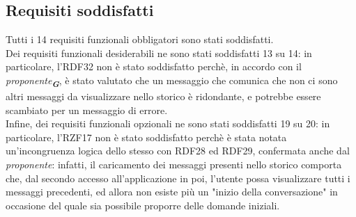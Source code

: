 \subsection{Requisiti soddisfatti}
\label{sec:requisiti_soddisfatti}

Tutti i 14 requisiti funzionali obbligatori sono stati soddisfatti.\\
Dei requisiti funzionali desiderabili ne sono stati soddisfatti 13 su 14: in particolare, l'RDF32 non è stato soddisfatto perchè, in accordo con il \emph{proponente}\textsubscript{\textbf{\textit{G}}}, è stato valutato che un messaggio che comunica che non ci sono altri messaggi da visualizzare nello storico è ridondante, e potrebbe essere scambiato per un messaggio di errore.\\
Infine, dei requisiti funzionali opzionali ne sono stati soddisfatti 19 su 20: in particolare, l'RZF17 non è stato soddisfatto perchè è stata notata un'incongruenza logica dello stesso con RDF28 ed RDF29, confermata anche dal \emph{proponente}: infatti, il caricamento dei messaggi presenti nello storico comporta che, dal secondo accesso all'applicazione in poi, l'utente possa visualizzare tutti i messaggi precedenti, ed allora non esiste più un "inizio della conversazione" in occasione del quale sia possibile proporre delle domande iniziali.
